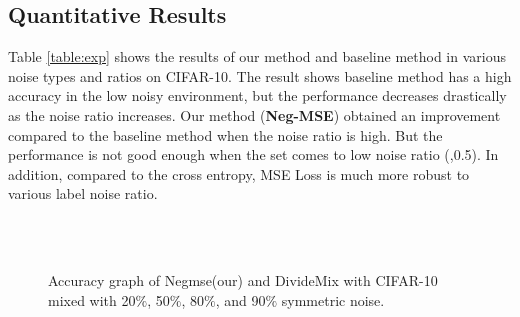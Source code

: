 \documentclass[10pt,twocolumn,letterpaper]{article}
\begin{document}
\subsection{Quantitative Results}
Table \ref{table:exp} shows the results of our method and baseline method in various noise types and ratios on CIFAR-10. The result shows baseline method has a high accuracy in the low noisy environment, but the performance decreases drastically as the noise ratio increases. Our method (\textbf{Neg-MSE}) obtained an improvement compared to the baseline method when the noise ratio is high. But the performance is not good enough when the set comes to low noise ratio (,0.5). In addition, compared to the cross entropy, MSE Loss is much more robust to various label noise ratio.

\begin{figure}[!htbp]
	\centering
	\quad
	\\
	\quad
	\\
	\caption{Accuracy graph of Negmse(our) and DivideMix with CIFAR-10 mixed with 20$\%$, 50$\%$, 80$\%$, and 90$\%$ symmetric noise.}
	\label{fig:Acc}
\end{figure}
\end{document}

